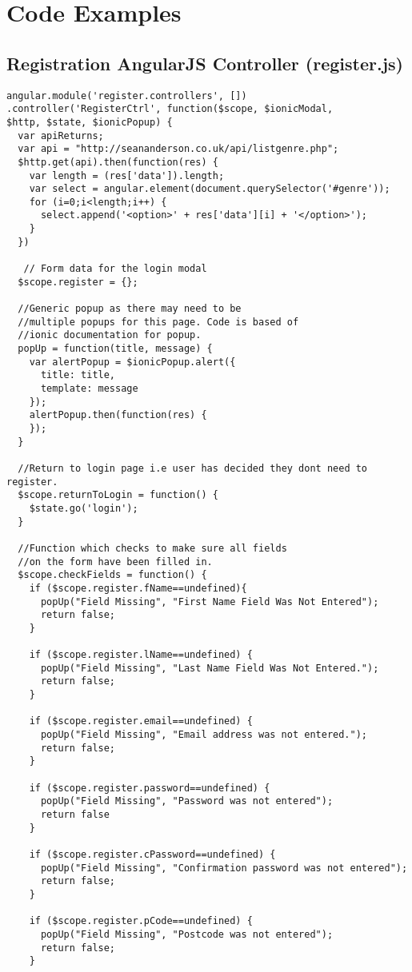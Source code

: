 \chapter{Code Examples}
\section{Registration AngularJS Controller (register.js)}
\begin{verbatim}
angular.module('register.controllers', [])
.controller('RegisterCtrl', function($scope, $ionicModal, 
$http, $state, $ionicPopup) {
  var apiReturns;
  var api = "http://seananderson.co.uk/api/listgenre.php";
  $http.get(api).then(function(res) {
    var length = (res['data']).length;
    var select = angular.element(document.querySelector('#genre'));
    for (i=0;i<length;i++) {
      select.append('<option>' + res['data'][i] + '</option>');
    }
  })

   // Form data for the login modal
  $scope.register = {};

  //Generic popup as there may need to be 
  //multiple popups for this page. Code is based of 
  //ionic documentation for popup.
  popUp = function(title, message) {
    var alertPopup = $ionicPopup.alert({
      title: title,
      template: message
    });
    alertPopup.then(function(res) {
    });
  }

  //Return to login page i.e user has decided they dont need to register.
  $scope.returnToLogin = function() {
    $state.go('login');
  }

  //Function which checks to make sure all fields 
  //on the form have been filled in.
  $scope.checkFields = function() {
    if ($scope.register.fName==undefined){
      popUp("Field Missing", "First Name Field Was Not Entered");
      return false;
    }

    if ($scope.register.lName==undefined) {
      popUp("Field Missing", "Last Name Field Was Not Entered.");
      return false;
    }

    if ($scope.register.email==undefined) {
      popUp("Field Missing", "Email address was not entered.");
      return false;
    }

    if ($scope.register.password==undefined) {
      popUp("Field Missing", "Password was not entered");
      return false
    }

    if ($scope.register.cPassword==undefined) {
      popUp("Field Missing", "Confirmation password was not entered");
      return false;
    }

    if ($scope.register.pCode==undefined) {
      popUp("Field Missing", "Postcode was not entered");
      return false;
    }


\end{verbatim}

